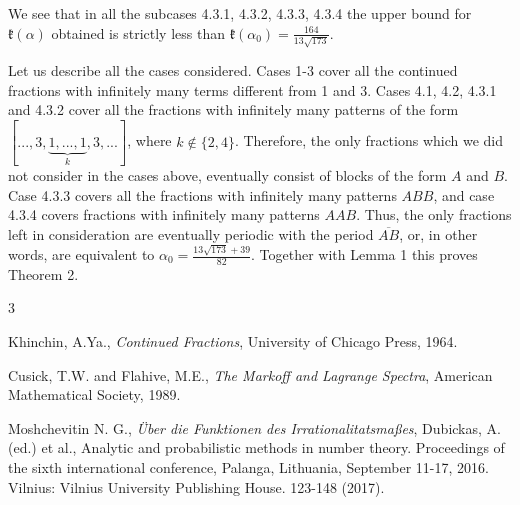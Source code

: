 \documentclass{article}
\begin{document}
We see that in all the subcases  4.3.1, 4.3.2, 4.3.3, 4.3.4 the upper bound for $\mathfrak{k}(\alpha) $ obtained is strictly less than $\mathfrak{k}(\alpha_0) = \frac{164}{13\sqrt{173}}$.

\medskip

Let us describe all the cases considered. 
Cases 1-3 cover all the continued fractions with infinitely many terms different from  1 and  3. Cases 4.1, 4.2, 4.3.1 and 4.3.2 cover all the fractions with infinitely many patterns of the form $[..., 3, \underbrace{1, ..., 1}_{k}, 3, ...]$, where $k\not\in\{2, 4\}$.
Therefore, the only fractions which we did not consider in the cases above, eventually consist of blocks of the form $ {A} $ and ${ B}$. Case 4.3.3 covers all the fractions with infinitely many patterns $ABB$, and case 4.3.4 covers fractions with infinitely many patterns $AAB$. Thus, the only fractions left in consideration are eventually  periodic with the period $\overline{AB}$, or, in other words, are equivalent to $\alpha_0=\frac{13\sqrt{173}+39}{82}$. Together with Lemma 1 this  proves Theorem 2.

 \medskip
 \begin{thebibliography}{3}

Khinchin, A.Ya., \emph{Continued Fractions}, University of Chicago Press, 1964.

Cusick, T.W. and Flahive, M.E., \emph{The Markoff and Lagrange Spectra}, American Mathematical Society, 1989.

Moshchevitin N. G., \emph{Über die Funktionen des Irrationalitatsma\ss es}, Dubickas, A. (ed.) et al., Analytic and probabilistic methods in number theory. Proceedings of the sixth international conference, Palanga, Lithuania, September 11-17, 2016. Vilnius: Vilnius University Publishing House. 123-148 (2017).
\end{thebibliography}
 

 
  
 
\end{document}
